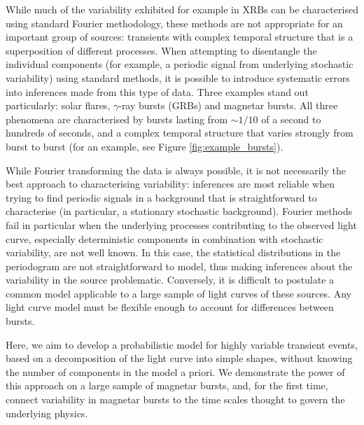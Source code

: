\documentclass[12pt]{emulateapj}
\begin{document}
While much of the variability exhibited for example in XRBs can be characterised using standard Fourier methodology, these methods are not appropriate for an important group of sources: transients 
with complex temporal structure that is a superposition of different processes. When attempting to disentangle the individual components (for example, a periodic signal from underlying stochastic variability)
using standard methods, it is possible to introduce systematic errors into inferences made from this type of data. Three examples stand out particularly: solar flares, $\gamma$-ray bursts (GRBs) and magnetar bursts.  All three phenomena are characterised by bursts lasting from $\sim\!\! 1/10$ of a second to hundreds of seconds, and a 
complex temporal structure that varies strongly from burst to burst (for an example, see Figure \ref{fig:example_bursts}). 

While Fourier transforming the data is always possible, it is not necessarily the best approach to characterising variability: inferences are most reliable when trying to find
periodic signals in a background that is straightforward to characterise (in particular, a stationary stochastic background).
Fourier methods fail in particular when the underlying processes contributing to the observed light curve, especially deterministic 
components in combination with stochastic variability, are not well known. In this case,
the statistical distributions in the periodogram are not straightforward to model, thus making inferences about the variability in the source problematic. Conversely, 
it is difficult to postulate a common model applicable to a large sample of light curves of these sources. Any light curve model must be flexible enough to account for differences between bursts. 

Here, we aim to develop a probabilistic 
model for highly variable transient events, based on a decomposition of the light curve into simple shapes, without knowing the number of components in the model a priori. We demonstrate the 
power of this approach on a large sample of magnetar bursts, and, for the first time, connect variability in magnetar bursts to the time scales thought to govern the underlying physics.

\end{document}
